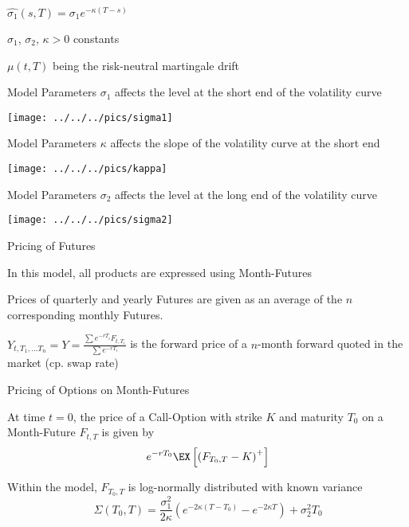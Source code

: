 	$\hat{\sigma_1}(s,T)=\sigma_1e^{-\kappa(T-s)}$


	$\sigma_1$, $\sigma_2$, $\kappa>0$ constants


	$\mu(t,T)$ being the risk-neutral martingale drift





{Model Parameters}
$\sigma_1$ affects the level at the short end of the volatility curve

\begin{center}
\texttt{[image: ../../../pics/sigma1]}
\end{center}

{Model Parameters}
$\kappa$ affects the slope of the volatility curve at the short end

\begin{center}
\texttt{[image: ../../../pics/kappa]}
\end{center}

{Model Parameters}
$\sigma_2$ affects the level at the long end of the volatility curve

\begin{center}
\texttt{[image: ../../../pics/sigma2]}
\end{center}

{Pricing of Futures}






	In this model, all products are expressed using Month-Futures


	Prices of quarterly and yearly Futures are given as an
average of the  $n$ corresponding monthly Futures.


	$Y_{t,T_1, \ldots T_n}=Y=\frac{\sum e^{-rT_i}F_{t,T_i}}{\sum e^{-rT_i}}$
is the forward price of a $n$-month forward quoted in the market (cp. swap rate)





{Pricing of Options on Month-Futures}






	At time $t=0$, the price of a  Call-Option with strike $K$ and maturity $T_0$ on a Month-Future $F_{t,T}$ is given by
$$e^{-rT_0}\EX\left[\left(F_{T_0,T}-K\right)^+\right]$$


	Within the model,  $F_{T_0,T}$ is log-normally distributed with known variance
$$
\Sigma(T_0,T) =   \frac{\sigma_1^2}{2\kappa}(e^{-2\kappa (T-T_0)}-e^{-2\kappa T})+\sigma_2^2T_0
$$


